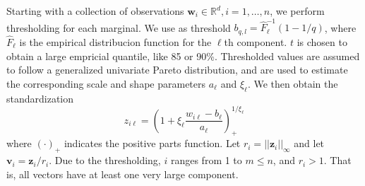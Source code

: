 Starting with a collection of observations 
    $\bm{w}_i \in {\mathbb R}^d, i = 1, \ldots, n$, we perform thresholding 
    for each marginal. We use as threshold 
    $b_{q,l} = \hat{F}^{-1}_{\ell}(1 - 1/q)$, where $\hat{F}_\ell$ is the 
    empirical distribucion function for the $\ell$th component. $t$ is 
    chosen to obtain a large empricial quantile, like 85 or 90\%. Thresholded 
    values are assumed to follow a generalized univariate Pareto distribution, 
    and are used to estimate the corresponding scale and shape parameters 
    $a_\ell$ and $\xi_\ell$. We then obtain the standardization
    \begin{equation}
        \label{eqn:standardization}
        z_{i\ell} = \left(1 + \xi_{\ell}\frac{w_{i\ell} -
            b_{\ell}}{a_{\ell}}\right)_{+}^{1/\xi_{\ell}}
    \end{equation}
    where $(\cdot)_+$ indicates the positive parts function. Let 
    $r_i = ||\bm{z}_i||_\infty$ and let $\bm{v}_i = \bm{z}_i/r_i$. Due to the 
    thresholding, $i$ ranges from 1 to $m\leq n$, and $r_i>1$.  That is, all 
    vectors have at least one very large component.

